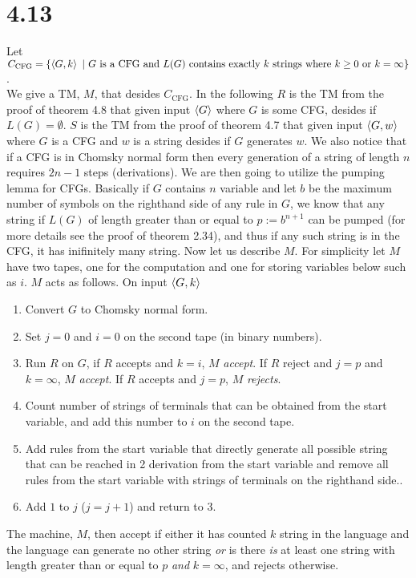 \documentclass[a4paper,11pt]{article}
\numberwithin{equation}{section}
\begin{document}
\section*{4.13}
Let $ C_{\text{CFG}}=\{\braket{G,k}\ \vert\ G\text{ is a CFG and }L(G)\text{ contains exactly }k\text{ strings where }k\geq0\text{ or }k=\infty\} $.\\
We give a TM, $ M $, that desides $ C_{\text{CFG}} $. In the following $ R $ is the TM from the proof of theorem 4.8 that given input $ \braket{G} $ where $ G $ is some CFG, desides if $ L(G)=\emptyset $. $ S $ is the  TM from the proof of theorem 4.7 that given input $ \braket{G,w} $ where $ G $ is a CFG and $ w $ is a string desides if $ G $ generates $ w $. We also notice that if a CFG is in Chomsky normal form then every generation of a string of length $ n $ requires $ 2n-1 $ steps (derivations). We are then going to utilize the pumping lemma for CFGs. Basically if $ G $ contains $ n $ variable and let $ b $ be the maximum number of symbols on the righthand side of any rule in $ G $, we know that any string if $ L(G) $ of length greater than or equal to $ p:=b^{n+1} $ can be pumped (for more details see the proof of theorem 2.34), and thus if any such string is in the CFG, it has inifinitely many string.
Now let us describe $ M $. For simplicity let $ M $ have two tapes, one for the computation and one for storing variables below such as $ i $.
$ M $ acts as follows. On input $ \braket{G,k} $ \begin{enumerate}
	\item Convert $ G $ to Chomsky normal form.
	\item Set $ j=0 $ and $ i=0 $ on the second tape (in binary numbers).
	\item Run $ R $ on $ G $, if $ R $ accepts and $ k=i $, $ M $ \emph{accept}. If $ R $ reject and $ j=p $ and $ k=\infty $, $ M $ \emph{accept}. If $ R $ accepts and $ j=p $, $ M $ \emph{rejects}.
	\item Count number of strings of terminals that can be obtained from the start variable, and add this number to $ i $ on the second tape.
	\item Add rules from the start variable that directly generate all possible string that can be reached in 2 derivation from the start variable and remove all rules from the start variable with strings of terminals on the righthand side..
	\item Add $ 1 $ to $ j $ ($ j=j+1 $) and return to 3.
\end{enumerate}
The machine, $ M $, then accept if either it has counted $ k $ string in the language and the language can generate no other string \emph{or} is there \emph{is} at least one string with length greater than or equal to $ p $ \emph{and} $ k=\infty $, and rejects otherwise.  
\end{document}
